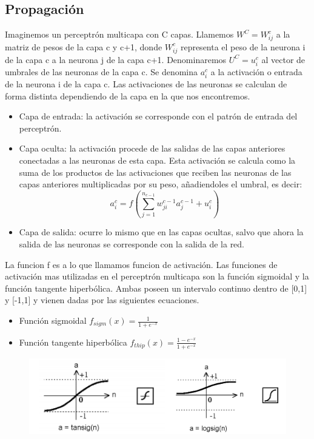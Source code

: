 \subsection{Propagación}
Imaginemos un perceptrón multicapa con C capas. Llamemos ${W^{C} = W^{c}_{ij}}$ a la matriz de pesos de la capa c y c+1, donde ${W^{c}_{ij}}$ representa el peso de la neurona i de la capa c a la neurona j de la capa c+1. Denominaremos ${U^{C} = u^{c}_{i}}$ al vector de umbrales de las neuronas de la capa c. Se denomina ${a^{c}_{i}}$ a la activación o entrada de la neurona i de la capa c. Las activaciones de las neuronas se calculan de forma distinta dependiendo de la capa en la que nos encontremos.
\begin{itemize}
\item Capa de entrada: la activación se corresponde con el patrón de entrada del perceptrón.
\item Capa oculta: la activación procede de las salidas de las capas anteriores conectadas a las neuronas de esta capa. Esta activación se calcula como la suma de los productos de las activaciones que reciben las neuronas de las capas anteriores multiplicadas por su peso, añadiendoles el umbral, es decir:\\
\begin{equation}
a_{i}^{c} = f(\sum_{j=1}^{n_{c-1}}w_{ji}^{c-1}a_{j}^{c-1}+u_{i}^{c})
\end{equation}
\item Capa de salida: ocurre lo mismo que en las capas ocultas, salvo que ahora la salida de las neuronas se corresponde con la salida de la red.
\end{itemize}
La funcion f es a lo que llamamos funcion de activación. Las funciones de activación mas utilizadas en el perceptrón multicapa son la función sigmoidal y la función tangente hiperbólica. Ambas poseen un intervalo continuo dentro de [0,1] y [-1,1] y vienen dadas por las siguientes ecuaciones.
\begin{itemize}
\item Función sigmoidal ${f_{sigm}(x)=\frac{1}{1+e^{-x}}}$
\item Función tangente hiperbólica ${f_{thip}(x)=\frac{1-e^{-x}}{1+e^{-x}}}$
\end{itemize}
\begin{figure}[htp]
\centering
\vspace{-1.5em}
\includegraphics[scale=0.6]{images/tansig_vs_logsig.png}
\end{figure}

